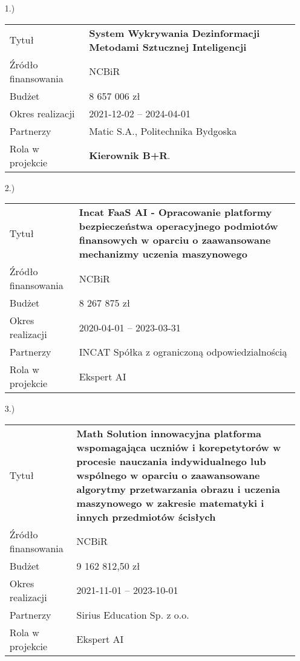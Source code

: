 \begin{fullwidth}
\begin{itemize}
		
\item[1.)]~\\
\begin{tabular}{p{10em}|p{20em}}
Tytuł &	\textbf{System Wykrywania Dezinformacji Metodami Sztucznej Inteligencji}\\
Źródło finansowania & NCBiR\\
Budżet & 8 657 006 zł\\
Okres realizacji & 2021-12-02 – 2024-04-01\\
Partnerzy & Matic S.A., Politechnika Bydgoska\\
Rola w projekcie & \textbf{Kierownik B+R}.
\end{tabular}

\item[2.)]~\\
\begin{tabular}{p{10em}|p{20em}}
Tytuł &	\textbf{Incat FaaS AI - Opracowanie platformy bezpieczeństwa operacyjnego podmiotów finansowych w oparciu o zaawansowane mechanizmy uczenia maszynowego}\\
Źródło finansowania & NCBiR\\
Budżet & 8 267 875 zł\\
Okres realizacji & 2020-04-01 -- 2023-03-31\\
Partnerzy & INCAT Spółka z ograniczoną odpowiedzialnością\\
Rola w projekcie & Ekspert AI
\end{tabular}

\item[3.)]~\\
\begin{tabular}{p{10em}|p{20em}}
Tytuł &	\textbf{Math Solution innowacyjna platforma wspomagająca uczniów i korepetytorów w procesie nauczania indywidualnego lub wspólnego w oparciu o zaawansowane algorytmy przetwarzania obrazu i uczenia maszynowego w zakresie matematyki i innych przedmiotów ścisłych}\\
Źródło finansowania & NCBiR\\
Budżet & 9 162 812,50 zł\\
Okres realizacji & 2021-11-01 -- 2023-10-01\\
Partnerzy & Sirius Education Sp. z o.o.\\
Rola w projekcie & Ekspert AI
\end{tabular}



\end{itemize}
\end{fullwidth}
